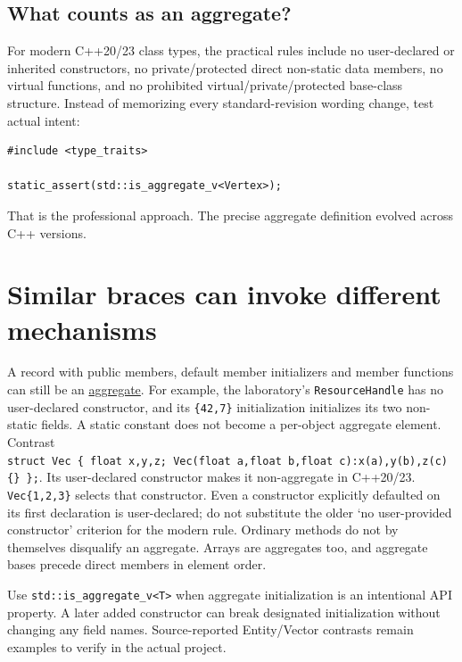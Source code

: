 \subsection{What counts as an aggregate?}\label{01-foundations-i-ch003-what-counts-as-an-aggregate}

\hypertarget{01-foundations-i-ch003-what-counts-as-an-aggregate}{}

For modern C++20/23 class types, the practical rules include no user-declared or inherited constructors, no private/protected direct non-static data members, no virtual functions, and no prohibited virtual/private/protected base-class structure. Instead of memorizing every standard-revision wording change, test actual intent:

\begin{verbatim}
#include <type_traits>

static_assert(std::is_aggregate_v<Vertex>);
\end{verbatim}

That is the professional approach. The precise aggregate definition evolved across C++ versions.

\section{Similar braces can invoke different mechanisms}\label{01-foundations-i-ch003-similar-braces-can-invoke-different-mechanisms}

\hypertarget{01-foundations-i-ch003-similar-braces-can-invoke-different-mechanisms}{}

A record with public members, default member initializers and member functions can still be an \hyperref[appendix-b7174c179542]{aggregate}. For example, the laboratory's \texttt{ResourceHandle} has no user-declared constructor, and its \texttt{\{42,7\}} initialization initializes its two non-static fields. A static constant does not become a per-object aggregate element. Contrast \texttt{struct\ Vec\ \{\ float\ x,y,z;\ Vec(float\ a,float\ b,float\ c):x(a),y(b),z(c)\{\}\ \};}. Its user-declared constructor makes it non-aggregate in C++20/23. \texttt{Vec\{1,2,3\}} selects that constructor. Even a constructor explicitly defaulted on its first declaration is user-declared; do not substitute the older `no user-provided constructor' criterion for the modern rule. Ordinary methods do not by themselves disqualify an aggregate. Arrays are aggregates too, and aggregate bases precede direct members in element order.

Use \texttt{std::is\_aggregate\_v\textless{}T\textgreater{}} when aggregate initialization is an intentional API property. A later added constructor can break designated initialization without changing any field names. Source-reported Entity/Vector contrasts remain examples to verify in the actual project.

